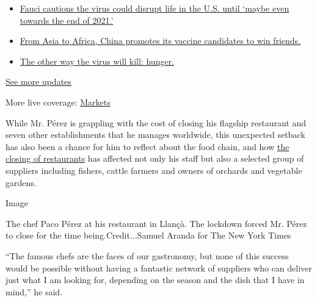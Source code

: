 \begin{itemize}
\tightlist
\item
  \href{https://www.nytimes3xbfgragh.onion/2020/09/11/world/covid-19-coronavirus.html?action=click\&pgtype=Article\&state=default\&region=MAIN_CONTENT_1\&context=storylines_live_updates\#link-dfb8a16}{Fauci
  cautions the virus could disrupt life in the U.S. until `maybe even
  towards the end of 2021.'}
\item
  \href{https://www.nytimes3xbfgragh.onion/2020/09/11/world/covid-19-coronavirus.html?action=click\&pgtype=Article\&state=default\&region=MAIN_CONTENT_1\&context=storylines_live_updates\#link-7104d154}{From
  Asia to Africa, China promotes its vaccine candidates to win friends.}
\item
  \href{https://www.nytimes3xbfgragh.onion/2020/09/11/world/covid-19-coronavirus.html?action=click\&pgtype=Article\&state=default\&region=MAIN_CONTENT_1\&context=storylines_live_updates\#link-393ad215}{The
  other way the virus will kill: hunger.}
\end{itemize}

\href{https://www.nytimes3xbfgragh.onion/2020/09/11/world/covid-19-coronavirus.html?action=click\&pgtype=Article\&state=default\&region=MAIN_CONTENT_1\&context=storylines_live_updates}{See
more updates}

More live coverage:
\href{https://www.nytimes3xbfgragh.onion/live/2020/09/11/business/stock-market-today-coronavirus?action=click\&pgtype=Article\&state=default\&region=MAIN_CONTENT_1\&context=storylines_live_updates}{Markets}

While Mr. Pérez is grappling with the cost of closing his flagship
restaurant and seven other establishments that he manages worldwide,
this unexpected setback has also been a chance for him to reflect about
the food chain, and how
\href{https://www.nytimes3xbfgragh.onion/2020/04/26/dining/restaurants-open-coronavirus.html}{the
closing of restaurants} has affected not only his staff but also a
selected group of suppliers including fishers, cattle farmers and owners
of orchards and vegetable gardens.

Image

The chef Paco Pérez at his restaurant in Llançà. The lockdown forced Mr.
Pérez to close for the time being.Credit...Samuel Aranda for The New
York Times

``The famous chefs are the faces of our gastronomy, but none of this
success would be possible without having a fantastic network of
suppliers who can deliver just what I am looking for, depending on the
season and the dish that I have in mind,'' he said.

